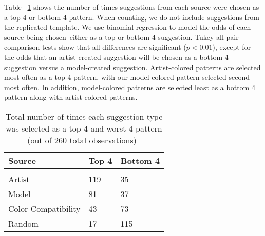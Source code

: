 
Table ~\ref{table:study} shows the number of times suggestions from each source were chosen as a top 4 or bottom 4 pattern. When counting, we do not include suggestions from the replicated template. We use binomial regression to model the odds of each source being chosen--either as a top or bottom 4 suggestion. Tukey all-pair comparison tests show that all differences are significant ($p < 0.01$), except for the odds that an artist-created suggestion will be chosen as a bottom 4 suggestion versus a model-created suggestion. Artist-colored patterns are selected most often as a top 4 pattern, with our model-colored pattern selected second most often. In addition, model-colored patterns are selected least as a bottom 4 pattern along with artist-colored patterns.


\begin{table}[h!]
  \begin{center}
\begin{tabular}{l| l l}
  \hline
\textbf{Source} & \textbf{Top 4} & \textbf{Bottom 4} \\
  \hline \\[-1.0em]
Artist & 119 & 35\\
Model & 81 & 37 \\
Color Compatibility & 43 & 73  \\
Random & 17 & 115 \\
\hline
\end{tabular}
\end{center}
\caption{Total number of times each suggestion type was selected as a top 4 and worst 4 pattern (out of 260 total observations)~}

 \label{table:study}
\end{table}